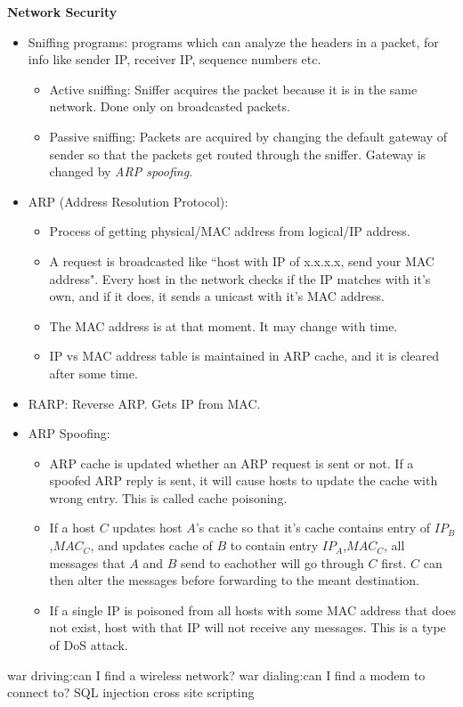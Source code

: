 \documentclass{article}
\begin{document}
\begin{center}
	\LARGE \textbf{Network Security}\\
	\vspace{20pt}
\end{center}
\large
\begin{itemize}
	\item Sniffing programs: programs which can analyze the headers in a packet, for info like sender IP, receiver IP, sequence numbers etc.
	\begin{itemize}
		\item Active sniffing: Sniffer acquires the packet because it is in the same network. Done only on broadcasted packets.
		\item Passive sniffing: Packets are acquired by changing the default gateway of sender so that the packets get routed through the sniffer. Gateway is changed by \textit{ARP spoofing}.
	\end{itemize}
	\item ARP (Address Resolution Protocol): \begin{itemize}
		\item Process of getting physical/MAC address from logical/IP address.
		\item A request is broadcasted like ``host with IP of x.x.x.x, send your MAC address". Every host in the network checks if the IP matches with it's own, and if it does, it sends a unicast with it's MAC address.
		\item The MAC address is at that moment. It may change with time.
		\item IP vs MAC address table is maintained in ARP cache, and it is cleared after some time.
	\end{itemize}
	\item RARP: Reverse ARP. Gets IP from MAC.
	\item ARP Spoofing:\begin{itemize}
		\item ARP cache is updated whether an ARP request is sent or not. If a spoofed ARP reply is sent, it will cause hosts to update the cache with wrong entry. This is called cache poisoning.
		\item If a host $C$ updates host $A$'s cache so that it's cache contains entry of $IP_B$,$MAC_C$, and updates cache of $B$ to contain entry $IP_A$,$MAC_C$, all messages that $A$ and $B$ send to eachother will go through $C$ first. $C$ can then alter the messages before forwarding to the meant destination.
		\item If a single IP is poisoned from all hosts with some MAC address that does not exist, host with that IP will not receive any messages. This is a type of DoS attack.
	\end{itemize}
\end{itemize}
war driving:can I find a wireless network?
war dialing:can I find a modem to connect to?
SQL injection
cross site scripting
\end{document}
